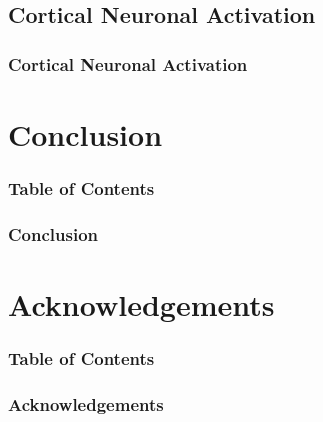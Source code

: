 \documentclass{beamer}
\begin{document}
\subsection{Cortical Neuronal Activation}
\begin{frame}
    \frametitle{Cortical Neuronal Activation}
\end{frame}

\section{Conclusion}
\begin{frame}[plain]
    \frametitle{Table of Contents}
\end{frame}

\begin{frame}
    \frametitle{Conclusion}
\end{frame}

\section{Acknowledgements}
\begin{frame}[plain]
    \frametitle{Table of Contents}
\end{frame}

\begin{frame}
    \frametitle{Acknowledgements}
\end{frame}
\end{document}

